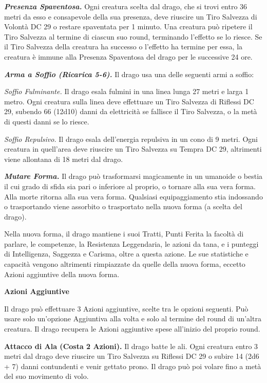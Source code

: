 \begin{multicols}{2}
{\emph{\textbf{Presenza Spaventosa.}} Ogni creatura scelta dal drago, che si trovi entro 36 metri da esso e consapevole della sua presenza, deve riuscire un Tiro Salvezza di Volontà DC 29 o restare spaventata per 1 minuto. Una creatura può ripetere il Tiro Salvezza al termine di ciascun suo round, terminando l'effetto se lo riesce. Se il Tiro Salvezza della creatura ha successo o l'effetto ha termine per essa, la creatura è immune alla Presenza Spaventosa del drago per le successive 24 ore.

\emph{\textbf{Arma a Soffio (Ricarica 5-6).}} Il drago usa una delle seguenti armi a soffio:

\emph{Soffio Fulminante.} Il drago esala fulmini in una linea lunga 27 metri e larga 1 metro. Ogni creatura sulla linea deve effettuare un Tiro Salvezza di Riflessi DC 29, subendo 66 (12d10) danni da elettricità se fallisce il Tiro Salvezza, o la metà di questi danni se lo riesce.

\emph{Soffio Repulsivo.} Il drago esala dell'energia repulsiva in un cono di 9 metri. Ogni creatura in quell'area deve riuscire un Tiro Salvezza su Tempra DC 29, altrimenti viene allontana di 18 metri dal drago.

\emph{\textbf{Mutare Forma.}} Il drago può trasformarsi magicamente in un umanoide o bestia il cui grado di sfida sia pari o inferiore al proprio, o tornare alla sua vera forma. Alla morte ritorna alla sua vera forma. Qualsiasi equipaggiamento stia indossando o trasportando viene assorbito o trasportato nella nuova forma (a scelta del drago).

Nella nuova forma, il drago mantiene i suoi Tratti, Punti Ferita la facoltà di parlare, le competenze, la Resistenza Leggendaria, le azioni da tana, e i punteggi di Intelligenza, Saggezza e Carisma, oltre a questa azione. Le sue statistiche e capacità vengono altrimenti rimpiazzate da quelle della nuova forma, eccetto Azioni aggiuntive della nuova forma.

\textbf{Azioni Aggiuntive}

Il drago può effettuare 3 Azioni aggiuntive, scelte tra le opzioni seguenti. Può usare solo un'opzione Aggiuntiva alla volta e solo al termine del round di un'altra creatura. Il drago recupera le Azioni aggiuntive spese all'inizio del proprio round.

\textbf{Attacco di Ala (Costa 2 Azioni).} Il drago batte le ali. Ogni creatura entro 3 metri dal drago deve riuscire un Tiro Salvezza su Riflessi DC 29 o subire 14 (2d6 + 7) danni contundenti e venir gettato prono. Il drago può poi volare fino a metà del suo movimento di volo.

}
\end{multicols}
